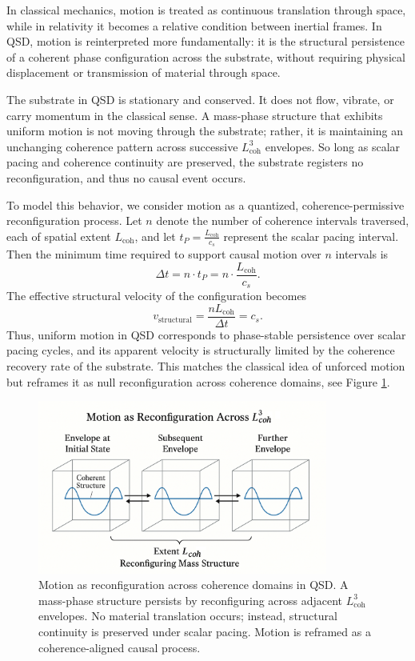 \documentclass[entropy,article,submit,pdftex,moreauthors]{Definitions/mdpi}
\begin{document}
In classical mechanics, motion is treated as continuous translation through space, while in relativity it becomes a relative condition between inertial frames. In QSD, motion is reinterpreted more fundamentally: it is the structural persistence of a coherent phase configuration across the substrate, without requiring physical displacement or transmission of material through space.

The substrate in QSD is stationary and conserved. It does not flow, vibrate, or carry momentum in the classical sense. A mass-phase structure that exhibits uniform motion is not moving through the substrate; rather, it is maintaining an unchanging coherence pattern across successive \texorpdfstring{\( L_{\text{coh}}^3 \)}{Lcoh\^{}3} envelopes. So long as scalar pacing and coherence continuity are preserved, the substrate registers no reconfiguration, and thus no causal event occurs.

To model this behavior, we consider motion as a quantized, coherence-permissive reconfiguration process. Let \( n \) denote the number of coherence intervals traversed, each of spatial extent \( L_{\text{coh}} \), and let \( t_P = \frac{L_{\text{coh}}}{c_s} \) represent the scalar pacing interval. Then the minimum time required to support causal motion over \( n \) intervals is
\[
\Delta t = n \cdot t_P = n \cdot \frac{L_{\text{coh}}}{c_s}.
\]
The effective structural velocity of the configuration becomes
\[
v_{\text{structural}} = \frac{n L_{\text{coh}}}{\Delta t} = c_s.
\]
Thus, uniform motion in QSD corresponds to phase-stable persistence over scalar pacing cycles, and its apparent velocity is structurally limited by the coherence recovery rate of the substrate. This matches the classical idea of unforced motion but reframes it as null reconfiguration across coherence domains, see Figure \ref{fig:motion}.

\begin{figure}[htbp]
\centering
\includegraphics[width=0.85\textwidth]{figures/motion.pdf}
\caption{Motion as reconfiguration across coherence domains in QSD. A mass-phase structure persists by reconfiguring across adjacent \( L_{\text{coh}}^3 \) envelopes. No material translation occurs; instead, structural continuity is preserved under scalar pacing. Motion is reframed as a coherence-aligned causal process.}
\label{fig:motion}
\end{figure}
\end{document}
